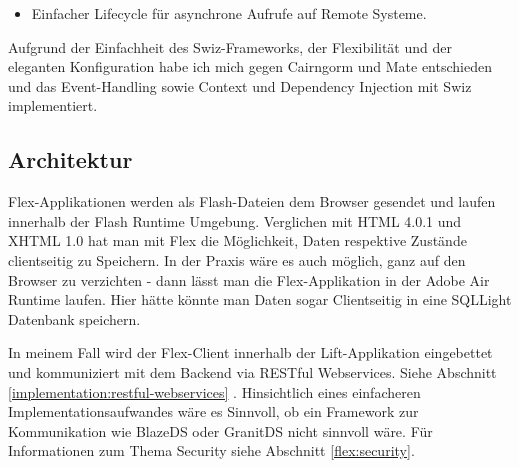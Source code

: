 \begin{itemize}
\begin{itemize}
\begin{lstlisting}[caption=Swiz: Event Observer]
[Mediate( event="Events.SEARCH_USERS", 
          properties="term" )]
public function searchUsers( term:String) : void
{
//...
}
\end{lstlisting}
Hier wird das Property term des geworfenen Events zus\"atzlich der Methode als Argument \"ubergeben.
\item Einfacher Lifecycle f\"ur asynchrone Aufrufe auf Remote Systeme.
\end{itemize}
\end{itemize}

Aufgrund der Einfachheit des Swiz-Frameworks, der Flexibilit\"at und der eleganten Konfiguration habe ich mich gegen Cairngorm und Mate entschieden und das Event-Handling sowie Context und Dependency Injection mit Swiz implementiert.

\subsection{Architektur}
Flex-Applikationen werden als Flash-Dateien dem Browser gesendet und laufen innerhalb der Flash Runtime Umgebung. Verglichen mit HTML 4.0.1 und XHTML 1.0 hat man mit Flex die M\"oglichkeit, Daten respektive Zust\"ande clientseitig zu Speichern. In der Praxis w\"are es auch m\"oglich, ganz auf den Browser zu verzichten - dann l\"asst man die Flex-Applikation in der Adobe Air Runtime laufen. Hier h\"atte k\"onnte man Daten sogar Clientseitig in eine SQLLight Datenbank speichern. 

In meinem Fall wird der Flex-Client innerhalb der Lift-Applikation eingebettet und kommuniziert mit dem Backend via RESTful\cite{wiki:rest} Webservices. Siehe Abschnitt \ref{implementation:restful-webservices} . Hinsichtlich eines einfacheren Implementationsaufwandes w\"are es Sinnvoll, ob ein Framework zur Kommunikation wie BlazeDS\cite{blazeDs}\cite{IntegratingBlazeDsLiftweb} oder GranitDS\cite{graniteDs} nicht sinnvoll w\"are. F\"ur Informationen zum Thema Security siehe Abschnitt \ref{flex:security}.


